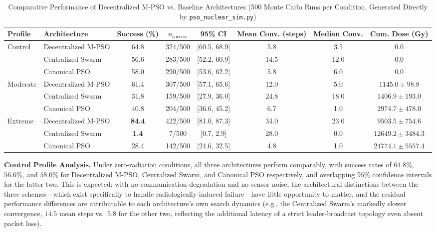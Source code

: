 \documentclass[journal]{IEEEtran}
\begin{document}
\begin{table}[t]
\renewcommand{\arraystretch}{1.15}
\caption{Comparative Performance of Decentralized M-PSO vs. Baseline Architectures (500 Monte Carlo Runs per Condition, Generated Directly by \texttt{pso\_nuclear\_sim.py})}
\label{tab:baseline-comparison}
\centering
\footnotesize
\begin{tabular}{@{}l l c c c c c c@{}}
\toprule
\textbf{Profile} & \textbf{Architecture} & \textbf{Success (\%)} & \textbf{$n_{\text{success}}$} & \textbf{95\% CI} & \textbf{Mean Conv. (steps)} & \textbf{Median Conv.} & \textbf{Cum. Dose (Gy)} \\
\midrule
\multirow{3}{*}{Control}
 & Decentralized M-PSO & 64.8 & 324/500 & [60.5, 68.9] & 5.8  & 3.5  & $0.0$ \\
 & Centralized Swarm   & 56.6 & 283/500 & [52.2, 60.9] & 14.5 & 12.0 & $0.0$ \\
 & Canonical PSO       & 58.0 & 290/500 & [53.6, 62.2] & 5.8  & 6.0  & $0.0$ \\
\midrule
\multirow{3}{*}{Moderate}
 & Decentralized M-PSO & 61.4 & 307/500 & [57.1, 65.6] & 12.0 & 5.0  & $1145.0 \pm 98.8$ \\
 & Centralized Swarm   & 31.8 & 159/500 & [27.9, 36.0] & 24.8 & 18.0 & $1406.9 \pm 193.0$ \\
 & Canonical PSO       & 40.8 & 204/500 & [36.6, 45.2] & 6.7  & 1.0  & $2974.7 \pm 478.0$ \\
\midrule
\multirow{3}{*}{Extreme}
 & Decentralized M-PSO & \textbf{84.4} & 422/500 & [81.0, 87.3] & 34.0 & 23.0 & $9503.5 \pm 754.6$ \\
 & Centralized Swarm   & \textbf{1.4}  & 7/500   & [0.7, 2.9]   & 28.0 & 0.0  & $12649.2 \pm 3484.3$ \\
 & Canonical PSO       & 28.4 & 142/500 & [24.6, 32.5] & 4.8  & 1.0  & $24774.1 \pm 5557.4$ \\
\bottomrule
\end{tabular}
\end{table}

\textbf{Control Profile Analysis.} Under zero-radiation conditions, all three architectures perform comparably, with success rates of $64.8\%$, $56.6\%$, and $58.0\%$ for Decentralized M-PSO, Centralized Swarm, and Canonical PSO respectively, and overlapping $95\%$ confidence intervals for the latter two. This is expected: with no communication degradation and no sensor noise, the architectural distinctions between the three schemes---which exist specifically to handle radiologically-induced failure---have little opportunity to matter, and the residual performance differences are attributable to each architecture's own search dynamics (e.g., the Centralized Swarm's markedly slower convergence, $14.5$ mean steps vs.\ $5.8$ for the other two, reflecting the additional latency of a strict leader-broadcast topology even absent packet loss).
\end{document}
